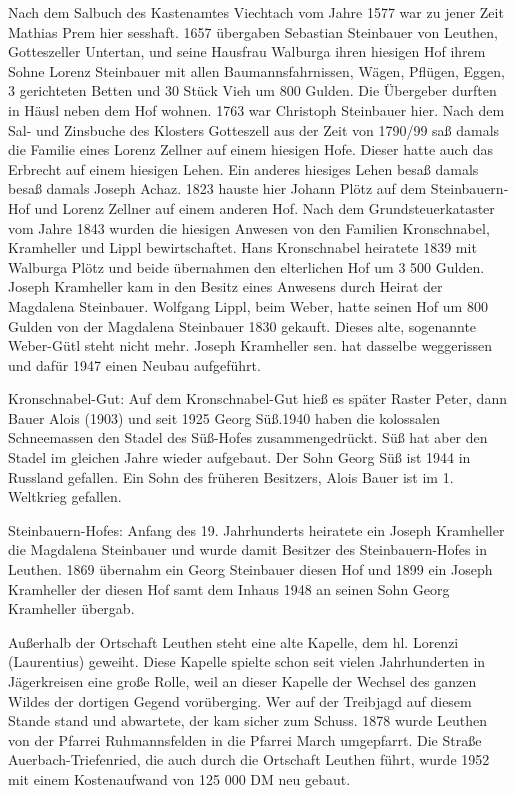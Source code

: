 \documentclass[12pt,a4pager]{book}
\begin{document}
Nach dem Salbuch des Kastenamtes Viechtach vom Jahre 1577 war zu jener Zeit
Mathias Prem hier sesshaft. 1657 übergaben Sebastian Steinbauer von Leuthen,
Gotteszeller Untertan, und seine Hausfrau Walburga ihren hiesigen Hof ihrem
Sohne Lorenz Steinbauer mit allen Baumannsfahrnissen, Wägen, Pflügen, Eggen, 3
gerichteten Betten und 30 Stück Vieh um 800 Gulden. Die Übergeber durften in
Häusl neben dem Hof wohnen. 1763 war Christoph Steinbauer hier. Nach dem Sal-
und Zinsbuche des Klosters Gotteszell aus der Zeit von 1790/99 saß damals die
Familie eines Lorenz Zellner auf einem hiesigen Hofe. Dieser hatte auch das
Erbrecht auf einem hiesigen Lehen. Ein anderes hiesiges Lehen besaß damals besaß
damals Joseph Achaz. 1823 hauste hier Johann Plötz auf dem Steinbauern-Hof und
Lorenz Zellner auf einem anderen Hof. Nach dem Grundsteuerkataster vom Jahre
1843 wurden die hiesigen Anwesen von den Familien Kronschnabel, Kramheller und
Lippl bewirtschaftet. Hans Kronschnabel heiratete 1839 mit Walburga Plötz und
beide übernahmen den elterlichen Hof um 3 500 Gulden. Joseph Kramheller kam in
den Besitz eines Anwesens durch Heirat der Magdalena Steinbauer. Wolfgang Lippl,
beim Weber, hatte seinen Hof um 800 Gulden von der Magdalena Steinbauer 1830
gekauft. Dieses alte, sogenannte Weber-Gütl steht nicht mehr. Joseph Kramheller
sen. hat dasselbe weggerissen und dafür 1947 einen Neubau aufgeführt.

Kronschnabel-Gut: Auf dem Kronschnabel-Gut hieß es später Raster Peter, dann
Bauer Alois (1903) und seit 1925 Georg Süß.1940 haben die kolossalen
Schneemassen den Stadel des Süß-Hofes zusammengedrückt. Süß hat aber den Stadel
im gleichen Jahre wieder aufgebaut. Der Sohn Georg Süß ist 1944 in Russland
gefallen. Ein Sohn des früheren Besitzers, Alois Bauer ist im 1. Weltkrieg
gefallen.

Steinbauern-Hofes: Anfang des 19. Jahrhunderts heiratete ein Joseph Kramheller
die Magdalena Steinbauer und wurde damit Besitzer des Steinbauern-Hofes in
Leuthen. 1869 übernahm ein Georg Steinbauer diesen Hof und 1899 ein Joseph
Kramheller der diesen Hof samt dem Inhaus 1948 an seinen Sohn Georg Kramheller
übergab.

Außerhalb der Ortschaft Leuthen steht eine alte Kapelle, dem hl. Lorenzi
(Laurentius) geweiht. Diese Kapelle spielte schon seit vielen Jahrhunderten in
Jägerkreisen eine große Rolle, weil an dieser Kapelle der Wechsel des ganzen
Wildes der dortigen Gegend vorüberging. Wer auf der Treibjagd auf diesem Stande
stand und abwartete, der kam sicher zum Schuss. 1878 wurde Leuthen von der
Pfarrei Ruhmannsfelden in die Pfarrei March umgepfarrt. Die Straße
Auerbach-Triefenried, die auch durch die Ortschaft Leuthen führt, wurde 1952 mit
einem Kostenaufwand von 125 000 DM neu gebaut.
\end{document}
